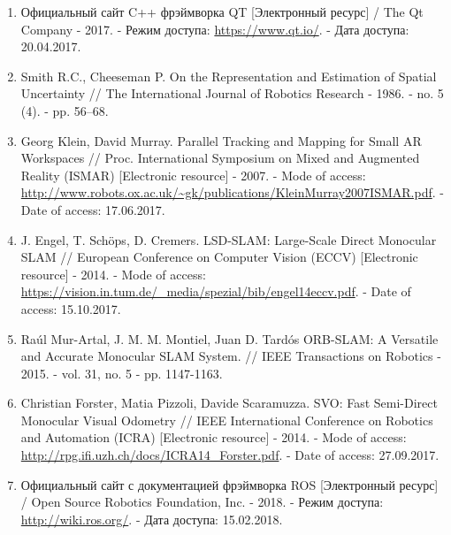 \begin{enumerate}
    \item \label{itm:qt} Официальный сайт C++ фрэймворка QT [Электронный ресурс] / The Qt Company - 2017. - Режим доступа: \url{https://www.qt.io/}. - Дата доступа: 20.04.2017.
    
    \item \label{itm:cheeseman} Smith R.C., Cheeseman P. On the Representation and Estimation of Spatial Uncertainty // The International Journal of Robotics Research - 1986. - no. 5 (4). - pp. 56–68.
    
    \item \label{itm:ptam} Georg Klein, David Murray. Parallel Tracking and Mapping for Small AR Workspaces // Proc. International Symposium on Mixed and Augmented Reality (ISMAR) [Electronic resource] - 2007. - Mode of access: \url{http://www.robots.ox.ac.uk/~gk/publications/KleinMurray2007ISMAR.pdf}. - Date of access: 17.06.2017.
    
    \newpage
    
    \item \label{itm:lsd} J. Engel, T. Schöps, D. Cremers. LSD-SLAM: Large-Scale Direct Monocular SLAM // European Conference on Computer Vision (ECCV) [Electronic resource] - 2014. - Mode of access: \url{https://vision.in.tum.de/_media/spezial/bib/engel14eccv.pdf}. - Date of access: 15.10.2017.
    
    \item \label{itm:orbslam} Raúl Mur-Artal, J. M. M. Montiel, Juan D. Tardós ORB-SLAM: A Versatile and Accurate Monocular SLAM System. // IEEE Transactions on Robotics - 2015. - vol. 31, no. 5 - pp. 1147-1163.
    
    \item \label{itm:svo} Christian Forster, Matia Pizzoli, Davide Scaramuzza. SVO: Fast Semi-Direct Monocular Visual Odometry // IEEE International Conference on Robotics and Automation (ICRA) [Electronic resource] - 2014. - Mode of access: \url{http://rpg.ifi.uzh.ch/docs/ICRA14_Forster.pdf}. - Date of access: 27.09.2017.
    
    \item \label{itm:last}\label{itm:ros} Официальный сайт с документацией фрэймворка ROS [Электронный ресурс] /  Open Source Robotics Foundation, Inc. - 2018. - Режим доступа: \url{http://wiki.ros.org/}. - Дата доступа: 15.02.2018.
\end{enumerate}

\newpage
